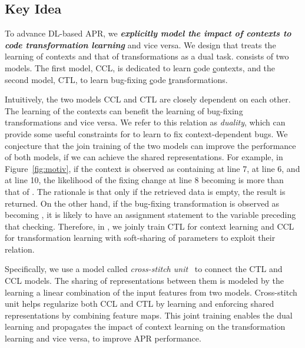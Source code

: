 \subsection{Key Idea}
\label{sec:key-idea}


To advance DL-based APR, we {\bf {\em explicitly model the impact of
  contexts to code transformation learning}} and vice versa.
We design {\tool} that treats the learning of contexts and
that of transformations as a dual task. {\tool}
consists of two models. The first model, CCL, is dedicated to
learn \underline{c}ode \underline{c}ontexts, and the second model, CTL, to
learn bug-fixing \underline{c}ode \underline{t}ransformations.



Intuitively, the two models CCL and CTL are closely dependent on each
other. The learning of the contexts can benefit the learning of
bug-fixing transformations and vice versa. We refer to this relation
as {\em duality}, which can provide some useful constraints for
{\tool} to learn to fix context-dependent bugs. We conjecture that the
join training of the two models can improve the performance of both
models, if we can achieve the shared representations. For example, in
Figure~\ref{fig:motiv}, if the context is observed as containing
 at line 7,  at line 6, and
 at line 10, the likelihood of the fixing change
at line 8 becoming  is more than that of
. The rationale is that only if the retrieved
data is empty, the result is returned. On the other hand, if the
bug-fixing transformation is observed as 
becoming , it is likely to have an assignment
statement to the variable  preceding that checking.
Therefore, in {\tool}, we joinly train CTL for context learning and
CCL for transformation learning with soft-sharing of parameters to
exploit their relation.

Specifically, we use a model called {\em cross-stitch
unit}~\cite{misra2016cross} to connect the CTL and CCL models. The
sharing of representations between them is modeled by the learning a
linear combination of the input features from two models. Cross-stitch
unit helps regularize both CCL and CTL by learning and enforcing
shared representations by combining feature maps. This joint training
enables the dual learning and propagates the impact of context
learning on the transformation learning and vice versa, to improve APR
performance.
